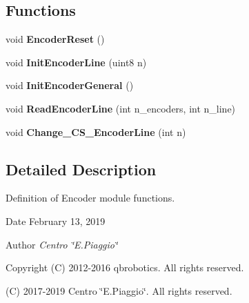 \subsection*{Functions}
\begin{DoxyCompactItemize}
\item 
\mbox{\label{_encoder__functions_8h_a1f711fe1ef258ba1b0d90cbce8a0e645}} 
void {\bfseries Encoder\+Reset} ()
\item 
\mbox{\label{_encoder__functions_8h_aa7dd2ab5bc6e906d2b1baa3dcf030197}} 
void {\bfseries Init\+Encoder\+Line} (uint8 n)
\item 
\mbox{\label{_encoder__functions_8h_a2ee4a1ed078be27aa04157f035933a2f}} 
void {\bfseries Init\+Encoder\+General} ()
\item 
\mbox{\label{_encoder__functions_8h_af23a5b3c809698c750feda90e24f85fe}} 
void {\bfseries Read\+Encoder\+Line} (int n\+\_\+encoders, int n\+\_\+line)
\item 
\mbox{\label{_encoder__functions_8h_a22b528bf1b9a7a0a86b618d7195b106b}} 
void {\bfseries Change\+\_\+\+C\+S\+\_\+\+Encoder\+Line} (int n)
\end{DoxyCompactItemize}


\subsection{Detailed Description}
Definition of Encoder module functions. 

\begin{DoxyDate}{Date}
February 13, 2019 
\end{DoxyDate}
\begin{DoxyAuthor}{Author}
{\itshape Centro \char`\"{}\+E.\+Piaggio\char`\"{}} 
\end{DoxyAuthor}
\begin{DoxyCopyright}{Copyright}
(C) 2012-\/2016 qbrobotics. All rights reserved. 

(C) 2017-\/2019 Centro \char`\"{}\+E.\+Piaggio\char`\"{}. All rights reserved. 
\end{DoxyCopyright}

